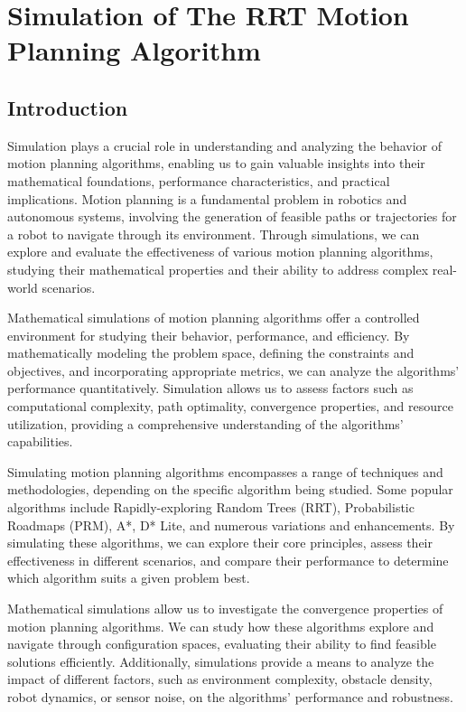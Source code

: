 \chapter{Simulation of The RRT Motion Planning Algorithm}

\section{Introduction}
Simulation plays a crucial role in understanding and analyzing the behavior of motion planning algorithms, enabling us to gain valuable insights into their mathematical foundations, performance characteristics, and practical implications. Motion planning is a fundamental problem in robotics and autonomous systems, involving the generation of feasible paths or trajectories for a robot to navigate through its environment. Through simulations, we can explore and evaluate the effectiveness of various motion planning algorithms, studying their mathematical properties and their ability to address complex real-world scenarios.

Mathematical simulations of motion planning algorithms offer a controlled environment for studying their behavior, performance, and efficiency. By mathematically modeling the problem space, defining the constraints and objectives, and incorporating appropriate metrics, we can analyze the algorithms' performance quantitatively. Simulation allows us to assess factors such as computational complexity, path optimality, convergence properties, and resource utilization, providing a comprehensive understanding of the algorithms' capabilities.

Simulating motion planning algorithms encompasses a range of techniques and methodologies, depending on the specific algorithm being studied. Some popular algorithms include Rapidly-exploring Random Trees (RRT), Probabilistic Roadmaps (PRM), A*, D* Lite, and numerous variations and enhancements. By simulating these algorithms, we can explore their core principles, assess their effectiveness in different scenarios, and compare their performance to determine which algorithm suits a given problem best.

Mathematical simulations allow us to investigate the convergence properties of motion planning algorithms. We can study how these algorithms explore and navigate through configuration spaces, evaluating their ability to find feasible solutions efficiently. Additionally, simulations provide a means to analyze the impact of different factors, such as environment complexity, obstacle density, robot dynamics, or sensor noise, on the algorithms' performance and robustness.

